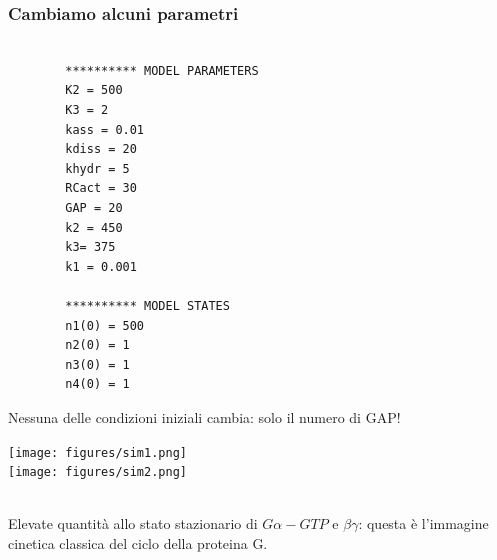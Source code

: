 \documentclass{article}
\begin{document}
\subsubsection*{Cambiamo alcuni parametri}
\begin{minipage}[c]{.5\textwidth}
    \centering
    \begin{verbatim}

        ********** MODEL PARAMETERS
        K2 = 500
        K3 = 2
        kass = 0.01
        kdiss = 20
        khydr = 5
        RCact = 30
        GAP = 20
        k2 = 450
        k3= 375
        k1 = 0.001
    
        ********** MODEL STATES
        n1(0) = 500
        n2(0) = 1
        n3(0) = 1
        n4(0) = 1

    \end{verbatim}
    Nessuna delle condizioni iniziali cambia: solo il numero di GAP!
\end{minipage}%
\begin{minipage}[c]{.5\textwidth}
    \centering
    \texttt{[image: figures/sim1.png]}\\
    \texttt{[image: figures/sim2.png]}
\end{minipage}\\
Elevate quantità allo stato stazionario di $G\alpha - GTP$ e $\beta \gamma$: questa è l'immagine cinetica classica del ciclo della proteina G.
\end{document}

